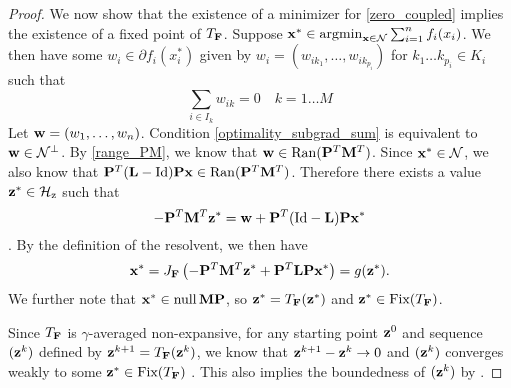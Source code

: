 \begin{proof}
We now show that the existence of a minimizer for \eqref{zero_coupled} implies the existence of a fixed point of $T_{\mathbf{F}}$.
Suppose $\mathbf{x}^* \in \operatorname*{argmin}_{\mathbf{x} \in \mathcal{N}} \sum_{i=1}^n f_i(x_i)$.
We then have some $w_i \in \partial f_i(x_i^*)$ given by $w_i = \left(w_{ik_1}, \dots, w_{ik_{p_i}}\right)$ for $k_1 \dots k_{p_i} \in K_i$ such that 
\begin{equation}\label{optimality_subgrad_sum}
    \sum_{i \in I_k} w_{ik} = 0 \quad k=1 \dots M
\end{equation}
Let $\mathbf{w} = \left(w_1, \dots, w_n\right)$.
Condition \eqref{optimality_subgrad_sum} is equivalent to $\mathbf{w} \in \mathcal{N}^\perp$.
By \eqref{range_PM}, we know that $\mathbf{w} \in \operatorname{Ran}(\mathbf{P}^T\mathbf{M}^T)$.
Since $\mathbf{x}^* \in \mathcal{N}$, we also know that $\mathbf{P}^T(\mathbf{L} - \mathrm{Id})\mathbf{P}\mathbf{x} \in \operatorname{Ran}(\mathbf{P}^T\mathbf{M}^T)$.
Therefore there exists a value $\mathbf{z}^* \in \mathcal{H}_\text{z}$ such that 
\[-\mathbf{P}^T \mathbf{M}^T \mathbf{z}^* = \mathbf{w} + \mathbf{P}^T(\mathrm{Id}-\mathbf{L})\mathbf{P}\mathbf{x}^*\].
By the definition of the resolvent, we then have
\[
\mathbf{x}^* = J_{\mathbf{F}}\left(-\mathbf{P}^T \mathbf{M}^T \mathbf{z}^* + \mathbf{P}^T \mathbf{L}\mathbf{P}\mathbf{x}^*\right) = g(\mathbf{z}^*).
\]
We further note that $\mathbf{x}^* \in \operatorname{null}{\mathbf{M}\mathbf{P}}$, so $\mathbf{z}^* = T_{\mathbf{F}}(\mathbf{z}^*)$ and $\mathbf{z}^* \in \text{Fix}(T_{\mathbf{F}})$.

Since $T_{\mathbf{F}}$ is $\gamma$-averaged non-expansive, for any starting point $\mathbf{z}^0$ and sequence $(\mathbf{z}^k)$ defined by $\mathbf{z}^{k+1} = T_{\mathbf{F}}(\mathbf{z}^k)$, we know that $\mathbf{z}^{k+1}-\mathbf{z}^k \to 0$ and $(\mathbf{z}^k)$ converges weakly to some $\mathbf{z}^* \in \text{Fix}(T_{\mathbf{F}})$ \cite[Prop 5.15]{bauschke_combettes}. 
This also implies the boundedness of $(\mathbf{z}^k)$ by \cite[Prop 2.40]{bauschke_combettes}.


\end{proof}
